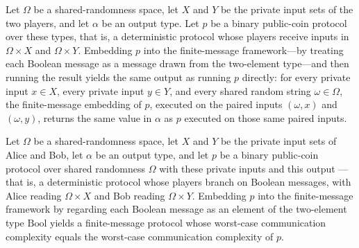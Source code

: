 \begin{theorem}
\label{CommunicationComplexity.PublicCoin.FiniteMessage.Protocol.ofProtocol_rrun}
\leanok
{}
Let $\Omega$ be a shared-randomness space, let $X$ and $Y$ be the private input sets of
the two players, and let $\alpha$ be an output type. Let $p$ be a binary public-coin
protocol over these types, that is, a deterministic protocol whose players receive
inputs in $\Omega \times X$ and $\Omega \times Y$. Embedding $p$ into the finite-message
framework—by treating each Boolean message as a message drawn from the two-element
type—and then running the result yields the same output as running $p$ directly: for
every private input $x \in X$, every private input $y \in Y$, and every shared random
string $\omega \in \Omega$, the finite-message embedding of $p$, executed on the paired
inputs $(\omega, x)$ and $(\omega, y)$, returns the same value in $\alpha$ as $p$
executed on those same paired inputs.
\end{theorem}

\begin{theorem}
\label{CommunicationComplexity.PublicCoin.FiniteMessage.Protocol.ofProtocol_complexity}
\leanok
{}
Let $\Omega$ be a shared-randomness space, let $X$ and $Y$ be the private input sets of
Alice and Bob, let $\alpha$ be an output type, and let $p$ be a binary public-coin
protocol over shared randomness $\Omega$ with these private inputs and this output —
that is, a deterministic protocol whose players branch on Boolean messages, with Alice
reading $\Omega \times X$ and Bob reading $\Omega \times Y$. Embedding $p$ into the
finite-message framework by regarding each Boolean message as an element of the
two-element type $\mathrm{Bool}$ yields a finite-message protocol whose worst-case
communication complexity equals the worst-case communication complexity of $p$.
\end{theorem}

